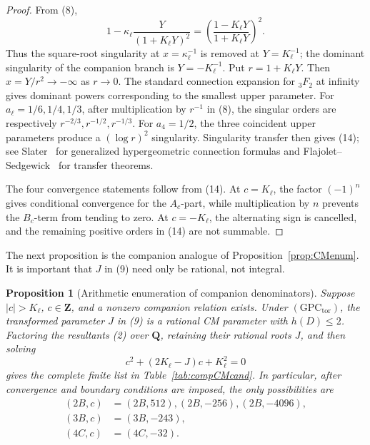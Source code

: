 \documentclass[11pt,a4paper]{amsart} %
\newtheorem{proposition}[theorem]{Proposition}
\theoremstyle{definition}
\begin{document}
\begin{proof}
From (8),
\[
1-\kappa_\ell\frac{Y}{(1+K_\ell Y)^2}
=
\left(\frac{1-K_\ell Y}{1+K_\ell Y}\right)^2.
\tag{16}
\]
Thus the square-root singularity at \(x=\kappa_\ell^{-1}\) is removed at
\(Y=K_\ell^{-1}\); the dominant singularity of the companion branch is
\(Y=-K_\ell^{-1}\). Put \(r=1+K_\ell Y\). Then
\(x=Y/r^2\to-\infty\) as \(r\to0\). The standard connection expansion for
\({}_3F_2\) at infinity gives dominant powers corresponding to the smallest
upper parameter. For \(a_\ell=1/6,1/4,1/3\), after multiplication by \(r^{-1}\)
in (8), the singular orders are respectively
\(r^{-2/3},r^{-1/2},r^{-1/3}\). For \(a_4=1/2\), the three coincident upper
parameters produce a \((\log r)^2\) singularity. Singularity transfer then
gives (14); see Slater~\cite[Ch.~4]{Slater} for generalized hypergeometric
connection formulas and Flajolet--Sedgewick~\cite[Ch.~VI]{FS} for transfer
theorems.

The four convergence statements follow from (14). At \(c=K_\ell\), the
factor \((-1)^n\) gives conditional convergence for the \(A_c\)-part, while
multiplication by \(n\) prevents the \(B_c\)-term from tending to zero. At
\(c=-K_\ell\), the alternating sign is cancelled, and the remaining positive
orders in (14) are not summable.
\end{proof}

The next proposition is the companion analogue of
Proposition~\ref{prop:CMenum}. It is important that \(J\) in (9) need only be
rational, not integral.

\begin{proposition}[Arithmetic enumeration of companion denominators]
\label{prop:compCMenum}
Suppose \(|c|>K_\ell\), \(c\in\mathbf Z\), and a nonzero companion relation
exists. Under \((\mathrm{GPC}_{\mathrm{tor}})\), the transformed parameter
\(J\) in (9) is a rational CM parameter with \(h(D)\le2\). Factoring the
resultants (2) over \(\mathbf Q\), retaining their rational roots \(J\), and
then solving
\[
c^2+(2K_\ell-J)c+K_\ell^2=0
\tag{17}
\]
gives the complete finite list in Table~\ref{tab:compCMcand}. In particular,
after convergence and boundary conditions are imposed, the only possibilities
are
\[
\begin{aligned}
(2B,c)&=(2B,512),(2B,-256),(2B,-4096),\\
(3B,c)&=(3B,-243),\\
(4C,c)&=(4C,-32).
\end{aligned}
\tag{18}
\]
\end{proposition}
\end{document}
